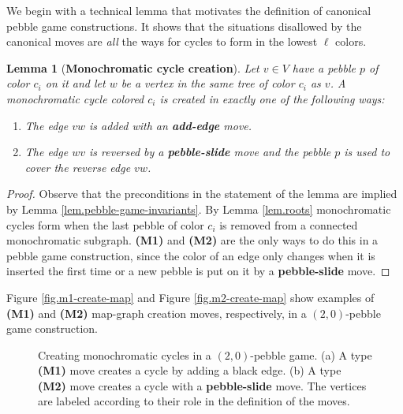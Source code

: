 \documentclass[Svgc,nospthms]{Svgc}
\newcommand{\reffig}[1]{Figure \ref{fig.#1}}
\newtheorem{lemma}[theorem]{Lemma}
\newcommand{\reflem}[1]{Lemma \ref{lem.#1}}
\newcommand{\labellem}[1]{\label{lem.#1}}
\begin{document}
We begin with a technical lemma that motivates the definition of canonical 
pebble game constructions.  It shows that the situations disallowed by 
the canonical moves are {\it all} the ways for cycles to form in 
the lowest $\ell$ colors.

\begin{lemma}[{\bf Monochromatic cycle creation}]\labellem{how-maps-form}
	Let $v\in V$ have a pebble $p$ of color $c_{i}$ on it and let $w$
	be a vertex in the same tree of color $c_i$ as $v$.	A  monochromatic cycle colored $c_{i}$ is 
	created in exactly one of the following ways: 
	\begin{enumerate}
		\item[{\bf (M1)}] The edge $vw$ is added with an {\bf add-edge} move.
		\item[{\bf (M2)}] The edge $wv$ is reversed by a {\bf pebble-slide} move and 
		the pebble $p$ is used to cover the reverse edge $vw$.	
	\end{enumerate}
	\end{lemma}
	 \begin{proof}
	 	Observe that the preconditions in the statement of the lemma are implied by
	 	 \reflem{pebble-game-invariants}. By \reflem{roots}  monochromatic 
	 	cycles form when the last pebble of color $c_{i}$ is removed from a 
	 	connected monochromatic subgraph. {\bf (M1)} and {\bf (M2)} 
	 	are the only ways to do this in a pebble game construction, since the 
		color of an edge only changes when it is inserted the first time 
		or a new pebble is put on it by a {\bf pebble-slide} move.
	  \end{proof}
	
	\reffig{m1-create-map} and \reffig{m2-create-map} show examples of 
	{\bf (M1)} and {\bf (M2)} map-graph creation moves, respectively, 
	in a $(2,0)$-pebble game construction.
	
	\begin{figure}[htbp]
		\centering
		\caption{Creating monochromatic cycles in a $(2,0)$-pebble game. (a) A type {\bf (M1)} move creates a cycle by adding a black edge.  (b) A type {\bf (M2)} move creates a cycle with a {\bf pebble-slide} move.
		The vertices are labeled according to their role in the definition of the moves.}
		\end{figure}
	
\end{document}

